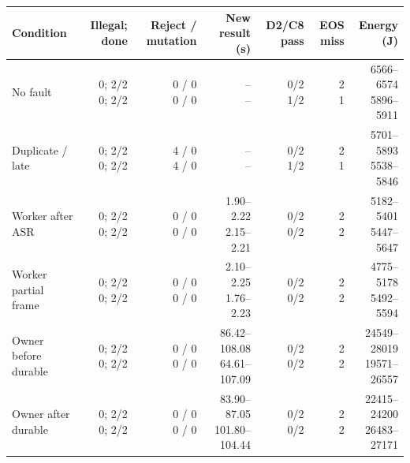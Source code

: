 \begin{tabular}{lrrrrrr}
\toprule
Condition & Illegal; done & Reject / mutation & New result (s) & D2/C8 pass & EOS miss & Energy (J) \\
\midrule
No fault & \shortstack{0; 2/2\\0; 2/2} & \shortstack{0 / 0\\0 / 0} & \shortstack{--\\--} & \shortstack{0/2\\1/2} & \shortstack{2\\1} & \shortstack{6566--6574\\5896--5911} \\
Duplicate / late & \shortstack{0; 2/2\\0; 2/2} & \shortstack{4 / 0\\4 / 0} & \shortstack{--\\--} & \shortstack{0/2\\1/2} & \shortstack{2\\1} & \shortstack{5701--5893\\5538--5846} \\
Worker after ASR & \shortstack{0; 2/2\\0; 2/2} & \shortstack{0 / 0\\0 / 0} & \shortstack{1.90--2.22\\2.15--2.21} & \shortstack{0/2\\0/2} & \shortstack{2\\2} & \shortstack{5182--5401\\5447--5647} \\
Worker partial frame & \shortstack{0; 2/2\\0; 2/2} & \shortstack{0 / 0\\0 / 0} & \shortstack{2.10--2.25\\1.76--2.23} & \shortstack{0/2\\0/2} & \shortstack{2\\2} & \shortstack{4775--5178\\5492--5594} \\
Owner before durable & \shortstack{0; 2/2\\0; 2/2} & \shortstack{0 / 0\\0 / 0} & \shortstack{86.42--108.08\\64.61--107.09} & \shortstack{0/2\\0/2} & \shortstack{2\\2} & \shortstack{24549--28019\\19571--26557} \\
Owner after durable & \shortstack{0; 2/2\\0; 2/2} & \shortstack{0 / 0\\0 / 0} & \shortstack{83.90--87.05\\101.80--104.44} & \shortstack{0/2\\0/2} & \shortstack{2\\2} & \shortstack{22415--24200\\26483--27171} \\
\bottomrule
\end{tabular}
